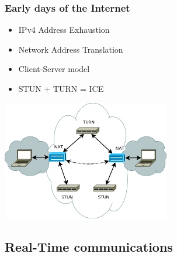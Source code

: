 \documentclass[compress]{beamer}
\begin{document}
  		\begin{frame}[c]
		\frametitle{Early days of the Internet}
		\begin{itemize}
		\item IPv4 Address Exhaustion
		\vfill
		\item Network Address Translation	
		\vfill
		\item Client-Server model
		\vfill
		\item STUN + TURN = ICE
		\end{itemize}
		\begin{flushright}

			\vspace*{-8\baselineskip}
			\includegraphics[width=0.55\textwidth]{figures/ice2.png}
		\end{flushright}
		
		\end{frame}




	\subsection{Real-Time communications}\label{rtc}
\end{document}
